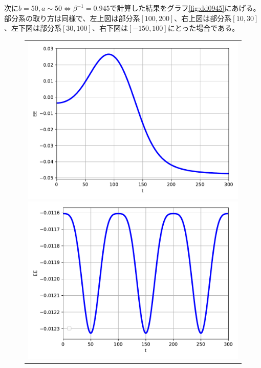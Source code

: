 次に$b=50,a\sim 50 \iff \beta^{-1}=0.945$で計算した結果をグラフ\ref{fig:dd0945}にあげる。部分系の取り方は同様で、左上図は部分系$[100,200]$、右上図は部分系$[10,30]$、左下図は部分系$[30,100]$、右下図は$[-150,100]$にとった場合である。
\begin{figure}[H]
	\centering
	\begin{tabular}{c}
		\begin{minipage}{0.50\hsize}
			\centering
			\includegraphics[width=\linewidth]{dd0945_100_200.pdf}
		\end{minipage}
		\begin{minipage}{0.50\hsize}
			\centering
			\includegraphics[width=\linewidth]{dd0945_10_30.pdf}
		\end{minipage}

\end{tabular}
\end{figure}
